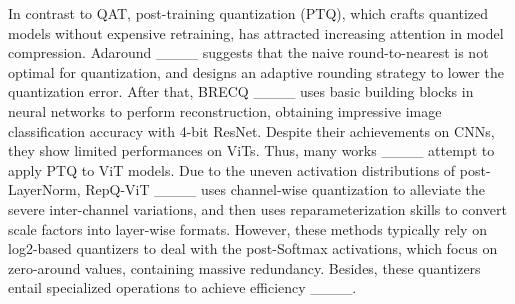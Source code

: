 In contrast to QAT, post-training quantization (PTQ), which crafts quantized models without expensive retraining, has attracted increasing attention in model compression. Adaround ____ suggests that the naive round-to-nearest is not optimal for quantization, and designs an adaptive rounding strategy to lower the quantization error. After that, BRECQ ____ uses basic building blocks in neural networks to perform reconstruction, obtaining impressive image classification accuracy with 4-bit ResNet.
Despite their achievements on CNNs, they show limited performances on ViTs. Thus, many works ____ attempt to apply PTQ to ViT models. Due to the uneven activation distributions of post-LayerNorm, RepQ-ViT ____ uses channel-wise quantization to alleviate the severe inter-channel variations, and then uses reparameterization skills to convert scale factors into layer-wise formats. However, these methods typically rely on log2-based quantizers to deal with the post-Softmax activations, which focus on zero-around values, containing massive redundancy. Besides, these quantizers entail specialized operations to achieve efficiency ____.